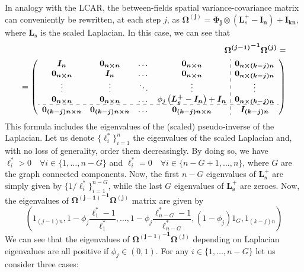 \documentclass[openany, 11pt, oneside]{book}
\begin{document}
\begin{subappendices}
In analogy with the LCAR, the between-fields spatial variance-covariance matrix can conveniently be rewritten, at each step $j$, as $\boldsymbol{\Omega^{(j)}} =  \boldsymbol{\Phi_j} \otimes\left( \boldsymbol{L}_s^+ - \boldsymbol{I_n} \right)+\boldsymbol{I_{kn}} $, where $\boldsymbol{L_s}$ is the scaled Laplacian. In this case, we can see that
\begin{align*}
\boldsymbol{{\Omega^{(j-1)}}^{-1}}\boldsymbol{\Omega^{(j)}} = \\ =
\left( \begin{array}{cccc:c}
\boldsymbol{I_n} & \boldsymbol{0_{n \times n}} & \dots & \boldsymbol{0_{n \times n}} & \boldsymbol{0_{n\times(k-j)n}} \\
\boldsymbol{0_{n \times n}}& \boldsymbol{I_n} & \dots & \boldsymbol{0_{n \times n}} & \boldsymbol{0_{n\times(k-j)n}} \\
\vdots & \vdots & \ddots & \vdots & \vdots\\
\boldsymbol{0_{n \times n}} & \boldsymbol{0_{n \times n}} & \dots & \phi_j\left( \boldsymbol{L_s^+}-\boldsymbol{I_n} \right) + \boldsymbol{I_n} & \boldsymbol{0_{n\times(k-j)n}} \\
\hdashline
\boldsymbol{0_{(k-j)n\times n}} & \boldsymbol{0_{(k-j)n\times n}} & \dots & \boldsymbol{0_{(k-j)n\times n}} & \boldsymbol{I_{(k-j)n}}
\end{array} \right)
\end{align*}
This formula includes the eigenvalues of the (scaled) pseudo-inverse of the Laplacian. Let us denote $\lbrace\ell_i^*\rbrace_{i=1}^{n}$ the eigenvalues of the scaled Laplacian and, with no loss of generality, order them decreasingly. By doing so, we have $\ell_i^* > 0 \quad \forall i \in \lbrace1, \dots, n-G\rbrace$ and $\ell_i^* = 0 \quad \forall i \in \lbrace n-G+1, \dots, n\rbrace$, where $G$ are the graph connected components. Now, the first $n-G$ eigenvalues of $\boldsymbol{L_s^+}$ are simply given by $\lbrace 1/ \ell_i^* \rbrace_{i=1}^{n-G}$, while the last $G$ eigenvalues of $\boldsymbol{L_s^+}$ are zeroes. Now, the eigenvalues of $\boldsymbol{{\Omega^{(j-1)}}^{-1}}\boldsymbol{\Omega^{(j)}}$ matrix are given by
\begin{equation}
\left(
1_{(j-1)n}, 1-\phi_j \frac{\ell_1^*-1}{\ell_1^*},  \dots,1-\phi_j \frac{\ell_{n-G}^*-1}{\ell_{n-G}^*},
(1-\phi_j)1_G, 1_{(k-j)n}
\right)
\label{eq:eigen_KLD_BYM}
\end{equation}
We can see that the eigenvalues of $\boldsymbol{{\Omega^{(j-1)}}^{-1}}\boldsymbol{\Omega^{(j)}}$ depending on Laplacian eigenvalues are all positive if $\phi_j \in (0,1)$. For any $i \in \lbrace1, \dots, n-G\rbrace$ let us consider three cases:

\end{subappendices}
\end{document}
